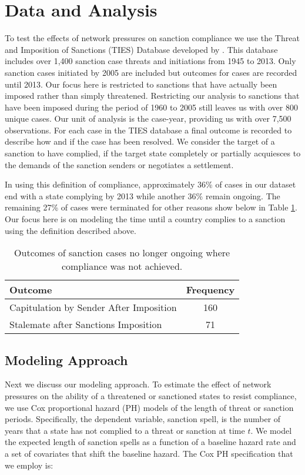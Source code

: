 \section*{Data and Analysis}
\label{empirics}

To test the effects of network pressures on sanction compliance we use the Threat and Imposition of Sanctions (TIES) Database developed by \citet{morgan2009threat}. This database includes over 1,400 sanction case threats and initiations from 1945 to 2013. Only sanction cases initiated by 2005 are included but outcomes for cases are recorded until 2013. Our focus here is restricted to sanctions that have actually been imposed rather than simply threatened. Restricting our analysis to sanctions that have been imposed during the period of 1960 to 2005 still leaves us with over 800 unique cases. Our unit of analysis is the case-year, providing us with over 7,500 observations. For each case in the TIES database a final outcome is recorded to describe how and if the case has been resolved. We consider the target of a sanction to have complied, if the target state completely or partially acquiesces to the demands of the sanction senders or negotiates a settlement.
	
In using this definition of compliance, approximately 36\% of cases in our dataset end with a state complying by 2013 while another 36\% remain ongoing. The remaining 27\% of cases were terminated for other reasons show below in Table \ref{tab:termCases}. Our focus here is on modeling the time until a country complies to a sanction using the definition described above.  

\begin{table}[ht]
	\centering
	\begin{tabular}{lc}
		\hline\hline
		Outcome & Frequency \\
		\hline
		Capitulation by Sender After Imposition & 160 \\
		Stalemate after Sanctions Imposition & 71 \\
		\hline\hline
	\end{tabular}
	\caption{Outcomes of sanction cases no longer ongoing where compliance was not achieved.}
	\label{tab:termCases}	
\end{table}

\subsection*{Modeling Approach} 

Next we discuss our modeling approach. To estimate the effect of network pressures on the ability of a threatened or sanctioned states to resist compliance, we use Cox proportional hazard (PH) models of the length of threat or sanction periods. Specifically, the dependent variable, sanction spell, is the number of years that a state has not complied to a threat or sanction at time $t$. We model the expected length of sanction spells as a function of a baseline hazard rate and a set of covariates that shift the baseline hazard. The Cox PH specification that we employ is:

